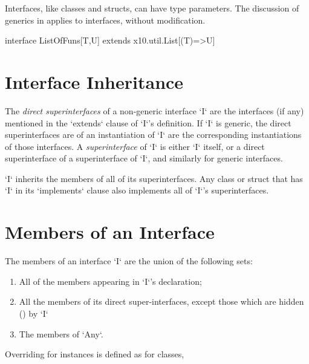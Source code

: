 Interfaces, like classes and structs, can have type parameters.  
The discussion of generics in  applies to interfaces,
without modification.

\begin{ex}
\begin{xten}
interface ListOfFuns[T,U] extends x10.util.List[(T)=>U] {}
\end{xten}
%

\end{ex}

\section{Interface Inheritance}

The {\em direct superinterfaces} of a non-generic interface \xcd`I` are the interfaces
(if any) mentioned in the \xcd`extends` clause of \xcd`I`'s definition.
If \xcd`I`  is generic, the direct superinterfaces are of an instantiation of
\xcd`I` are the corresponding instantiations of those interfaces.
A {\em superinterface} of \xcd`I` is either \xcd`I` itself, or a direct
superinterface of a superinterface of \xcd`I`, and similarly for generic
interfaces.    

\xcd`I` inherits the members of all of its superinterfaces. Any class or
struct that has \xcd`I` in its \xcd`implements` clause also implements all of
\xcd`I`'s superinterfaces. 






\section{Members of an Interface}

The members of an interface \xcd`I` are the union of the following sets: 
\begin{enumerate}
\item All of the members appearing in \xcd`I`'s declaration;
\item All the members of its direct super-interfaces, except those which are
      hidden () by \xcd`I`
\item The members of \xcd`Any`.
\end{enumerate}

Overriding for instances is defined as for classes, 
